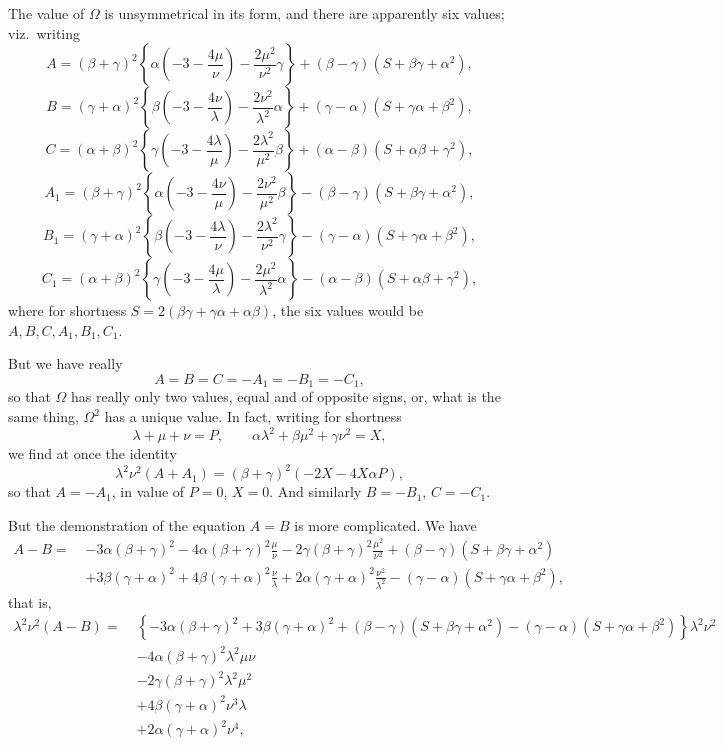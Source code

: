 \documentclass[11pt,a4paper]{article}
\begin{document}
The value of $\Omega$ is unsymmetrical in its form, and there are apparently six values; viz.\ writing
\[
A = (\beta + \gamma)^{2}\!\left\{\alpha\!\left(-3 - \frac{4\mu}{\nu}\right) - \frac{2\mu^{2}}{\nu^{2}}\gamma\right\} + (\beta - \gamma)(S + \beta\gamma + \alpha^{2}),
\]
\[
B = (\gamma + \alpha)^{2}\!\left\{\beta\!\left(-3 - \frac{4\nu}{\lambda}\right) - \frac{2\nu^{2}}{\lambda^{2}}\alpha\right\} + (\gamma - \alpha)(S + \gamma\alpha + \beta^{2}),
\]
\[
C = (\alpha + \beta)^{2}\!\left\{\gamma\!\left(-3 - \frac{4\lambda}{\mu}\right) - \frac{2\lambda^{2}}{\mu^{2}}\beta\right\} + (\alpha - \beta)(S + \alpha\beta + \gamma^{2}),
\]
\[
A_{1} = (\beta + \gamma)^{2}\!\left\{\alpha\!\left(-3 - \frac{4\nu}{\mu}\right) - \frac{2\nu^{2}}{\mu^{2}}\beta\right\} - (\beta - \gamma)(S + \beta\gamma + \alpha^{2}),
\]
\[
B_{1} = (\gamma + \alpha)^{2}\!\left\{\beta\!\left(-3 - \frac{4\lambda}{\nu}\right) - \frac{2\lambda^{2}}{\nu^{2}}\gamma\right\} - (\gamma - \alpha)(S + \gamma\alpha + \beta^{2}),
\]
\[
C_{1} = (\alpha + \beta)^{2}\!\left\{\gamma\!\left(-3 - \frac{4\mu}{\lambda}\right) - \frac{2\mu^{2}}{\lambda^{2}}\alpha\right\} - (\alpha - \beta)(S + \alpha\beta + \gamma^{2}),
\]
where for shortness $S = 2(\beta\gamma + \gamma\alpha + \alpha\beta)$, the six values would be $A, B, C, A_{1}, B_{1}, C_{1}$.

But we have really
\[
A = B = C = -A_{1} = -B_{1} = -C_{1},
\]
so that $\Omega$ has really only two values, equal and of opposite signs, or, what is the same thing, $\Omega^{2}$ has a unique value. In fact, writing for shortness
\[
\lambda + \mu + \nu = P, \qquad \alpha\lambda^{2} + \beta\mu^{2} + \gamma\nu^{2} = X,
\]
we find at once the identity
\[
\lambda^{2}\nu^{2}(A + A_{1}) = (\beta + \gamma)^{2}(-2X - 4X\alpha P),
\]
so that $A = -A_{1}$, in value of $P = 0$, $X = 0$. And similarly $B = -B_{1}$, $C = -C_{1}$.

But the demonstration of the equation $A = B$ is more complicated. We have
\[
\begin{aligned}
A - B =\;& -3\alpha(\beta + \gamma)^{2} - 4\alpha(\beta + \gamma)^{2}\frac{\mu}{\nu} - 2\gamma(\beta + \gamma)^{2}\frac{\mu^{2}}{\nu^{2}} + (\beta - \gamma)(S + \beta\gamma + \alpha^{2}) \\
& + 3\beta(\gamma + \alpha)^{2} + 4\beta(\gamma + \alpha)^{2}\frac{\nu}{\lambda} + 2\alpha(\gamma + \alpha)^{2}\frac{\nu^{2}}{\lambda^{2}} - (\gamma - \alpha)(S + \gamma\alpha + \beta^{2}),
\end{aligned}
\]
that is,
\[
\begin{aligned}
\lambda^{2}\nu^{2}(A - B) =\;& \left\{-3\alpha(\beta + \gamma)^{2} + 3\beta(\gamma + \alpha)^{2} + (\beta - \gamma)(S + \beta\gamma + \alpha^{2}) - (\gamma - \alpha)(S + \gamma\alpha + \beta^{2})\right\}\lambda^{2}\nu^{2} \\
& - 4\alpha(\beta + \gamma)^{2}\lambda^{2}\mu\nu \\
& - 2\gamma(\beta + \gamma)^{2}\lambda^{2}\mu^{2} \\
& + 4\beta(\gamma + \alpha)^{2}\nu^{3}\lambda \\
& + 2\alpha(\gamma + \alpha)^{2}\nu^{4},
\end{aligned}
\]
\end{document}
